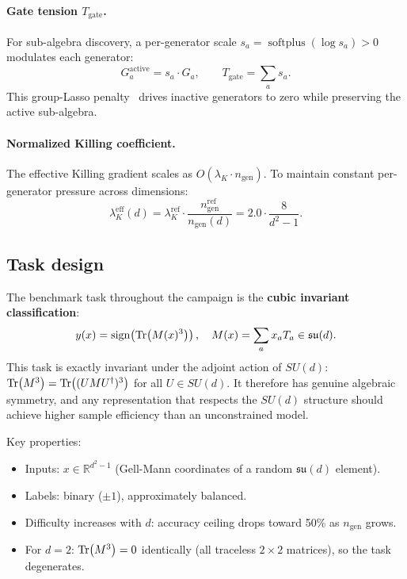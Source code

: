\documentclass[11pt,a4paper]{article}
\newcommand{\fksu}{\mathfrak{su}}
\newcommand{\RR}{\mathbb{R}}
\newcommand{\Tgate}{T_{\mathrm{gate}}}
\newcommand{\ngen}{n_{\mathrm{gen}}}
\theoremstyle{definition}
\begin{document}
\paragraph{Gate tension $\Tgate$.}
For sub-algebra discovery, a per-generator scale 
$s_a = \operatorname{softplus}(\log s_a) > 0$ modulates each generator:
\begin{equation}
  G_a^{\mathrm{active}} = s_a \cdot G_a, 
  \qquad \Tgate = \sum_a s_a.
\end{equation}
This group-Lasso penalty~\cite{yuan2006model} drives inactive generators 
to zero while preserving the active sub-algebra.

\paragraph{Normalized Killing coefficient.}
The effective Killing gradient scales as $O(\lambda_K \cdot \ngen)$. 
To maintain constant per-generator pressure across dimensions:
\begin{equation}
  \label{eq:lambda_norm}
  \lambda_K^{\mathrm{eff}}(d) 
  = \lambda_K^{\mathrm{ref}} \cdot \frac{\ngen^{\mathrm{ref}}}{\ngen(d)}
  = 2.0 \cdot \frac{8}{d^2 - 1}.
\end{equation}

\subsection{Task design}
\label{sec:task}

The benchmark task throughout the campaign is the \textbf{cubic invariant 
classification}:
\begin{equation}
  \label{eq:task}
  y(x) = \operatorname{sign}\!\left(\Tr(M(x)^3)\right), 
  \quad M(x) = \sum_a x_a T_a \in \fksu(d).
\end{equation}
This task is exactly invariant under the adjoint action of $SU(d)$: 
$\Tr(M^3) = \Tr((UMU^\dagger)^3)$ for all $U \in SU(d)$. It therefore 
has genuine algebraic symmetry, and any representation that respects the 
$SU(d)$ structure should achieve higher sample efficiency than an 
unconstrained model.

Key properties:
\begin{itemize}[nosep]
  \item Inputs: $x \in \RR^{d^2-1}$ (Gell-Mann coordinates of a random 
    $\fksu(d)$ element).
  \item Labels: binary ($\pm 1$), approximately balanced.
  \item Difficulty increases with $d$: accuracy ceiling drops toward 50\% 
    as $\ngen$ grows.
  \item For $d = 2$: $\Tr(M^3) = 0$ identically (all traceless $2\times 2$ 
    matrices), so the task degenerates.
\end{itemize}
\end{document}
